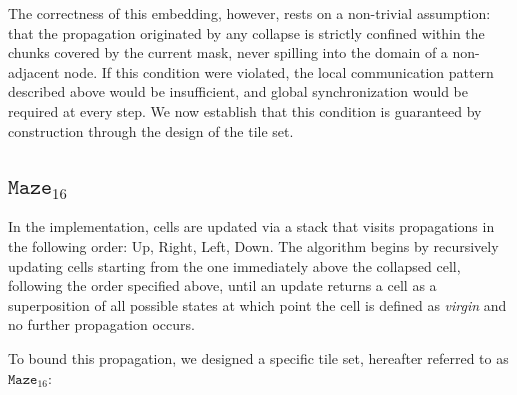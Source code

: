 The correctness of this embedding, however, rests on a non-trivial assumption:
that the propagation originated by any collapse is strictly confined within the
chunks covered by the current mask, never spilling into the domain of a
non-adjacent node. If this condition were violated, the local communication
pattern described above would be insufficient, and global synchronization would
be required at every step. We now establish that this condition is guaranteed
by construction through the design of the tile set.

\subsection{$\texttt{Maze}_{16}$}
In the implementation, cells are updated via a stack that visits propagations
in the following order: Up, Right, Left, Down. The algorithm begins by
recursively updating cells starting from the one immediately above the collapsed
cell, following the order specified above, until an update returns a cell as a
superposition of all possible states at which point the cell is defined as
\textit{virgin} and no further propagation occurs.

To bound this propagation, we designed a specific tile set, hereafter referred
to as $\texttt{Maze}_{16}$:

